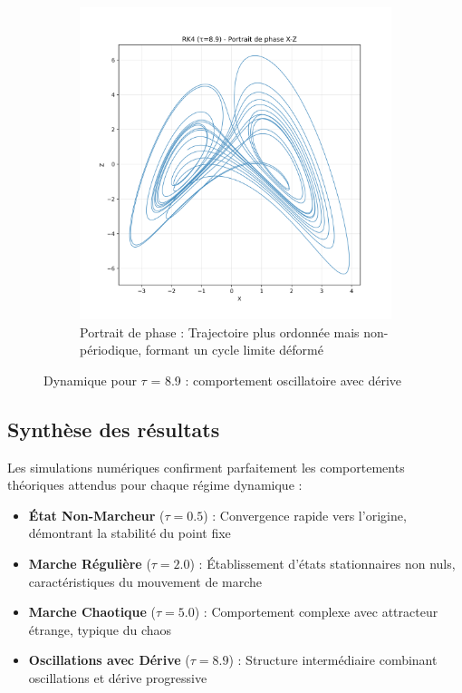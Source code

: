 \begin{figure}[H]
\begin{subfigure}[b]{0.4\textwidth}
    \end{subfigure}
    \begin{subfigure}[b]{0.3\textwidth}
        \includegraphics[width=\textwidth]{figures/rk4/rk4_tau8.9_phase}
        \caption{Portrait de phase : Trajectoire plus ordonnée mais non-périodique, formant un cycle limite déformé}
    \end{subfigure}
    \caption{Dynamique pour $\tau$ = 8.9 : comportement oscillatoire avec dérive}
    \label{fig:rk4_tau8.9}
\end{figure}

\subsection{Synthèse des résultats}
Les simulations numériques confirment parfaitement les comportements théoriques attendus pour chaque régime dynamique :

\begin{itemize}
    \item \textbf{État Non-Marcheur} ($\tau = 0.5$) : Convergence rapide vers l'origine, démontrant la stabilité du point fixe
    \item \textbf{Marche Régulière} ($\tau = 2.0$) : Établissement d'états stationnaires non nuls, caractéristiques du mouvement de marche
    \item \textbf{Marche Chaotique} ($\tau = 5.0$) : Comportement complexe avec attracteur étrange, typique du chaos
    \item \textbf{Oscillations avec Dérive} ($\tau = 8.9$) : Structure intermédiaire combinant oscillations et dérive progressive
\end{itemize}

